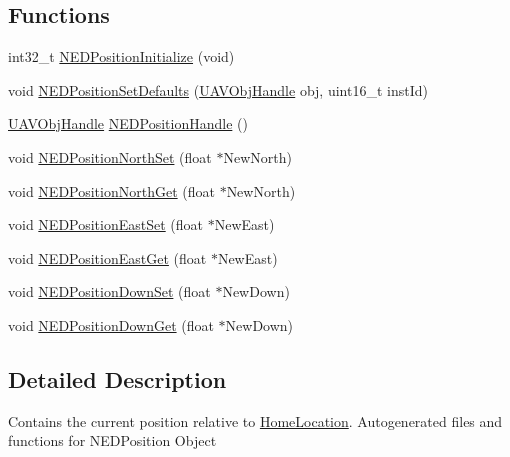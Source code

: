 \subsection*{\-Functions}
\begin{DoxyCompactItemize}
\item 
int32\-\_\-t \hyperlink{group___n_e_d_position_ga40a16d2c3db5d680c6af7e7c53d36f3c}{\-N\-E\-D\-Position\-Initialize} (void)
\item 
void \hyperlink{group___n_e_d_position_gab16b38634756482ee2dd8745a882b7fc}{\-N\-E\-D\-Position\-Set\-Defaults} (\hyperlink{targets_2_u_a_v_objects_2inc_2uavobjectmanager_8h_a279053e22be53ce9f895043aaeb91e3b}{\-U\-A\-V\-Obj\-Handle} obj, uint16\-\_\-t inst\-Id)
\item 
\hyperlink{targets_2_u_a_v_objects_2inc_2uavobjectmanager_8h_a279053e22be53ce9f895043aaeb91e3b}{\-U\-A\-V\-Obj\-Handle} \hyperlink{group___n_e_d_position_gaf3bb1c63929db2ccf97b89fa7249a7a5}{\-N\-E\-D\-Position\-Handle} ()
\item 
void \hyperlink{group___n_e_d_position_ga27a7fdf5f6b887a87a51dcfe725e9071}{\-N\-E\-D\-Position\-North\-Set} (float $\ast$\-New\-North)
\item 
void \hyperlink{group___n_e_d_position_ga9980ed017e21706a566cfbdf60ddd8dc}{\-N\-E\-D\-Position\-North\-Get} (float $\ast$\-New\-North)
\item 
void \hyperlink{group___n_e_d_position_ga020cc284455812b0ee6612356136ecd7}{\-N\-E\-D\-Position\-East\-Set} (float $\ast$\-New\-East)
\item 
void \hyperlink{group___n_e_d_position_ga550a3047d61dae7b3dcb5884a9b3ac48}{\-N\-E\-D\-Position\-East\-Get} (float $\ast$\-New\-East)
\item 
void \hyperlink{group___n_e_d_position_gab5afa9fd2274bfee6077b4b388324ea7}{\-N\-E\-D\-Position\-Down\-Set} (float $\ast$\-New\-Down)
\item 
void \hyperlink{group___n_e_d_position_gad12450bc4f2f26271cdccf14503254b3}{\-N\-E\-D\-Position\-Down\-Get} (float $\ast$\-New\-Down)
\end{DoxyCompactItemize}


\subsection{\-Detailed \-Description}
\-Contains the current position relative to \hyperlink{group___home_location}{\-Home\-Location}. \-Autogenerated files and functions for \-N\-E\-D\-Position \-Object 

